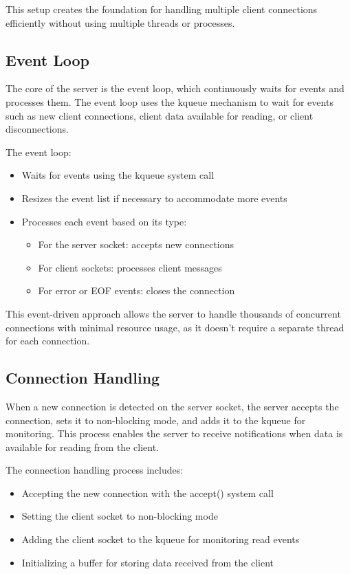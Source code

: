\documentclass{article}
\begin{document}
\noindent This setup creates the foundation for handling multiple client connections efficiently without using multiple threads or processes.

\subsection{Event Loop}

The core of the server is the event loop, which continuously waits for events and processes them. The event loop uses the kqueue mechanism to wait for events such as new client connections, client data available for reading, or client disconnections.

\noindent The event loop:
\begin{itemize}
    \item Waits for events using the kqueue system call
    \item Resizes the event list if necessary to accommodate more events
    \item Processes each event based on its type:
    \begin{itemize}
        \item For the server socket: accepts new connections
        \item For client sockets: processes client messages
        \item For error or EOF events: closes the connection
    \end{itemize}
\end{itemize}

\noindent This event-driven approach allows the server to handle thousands of concurrent connections with minimal resource usage, as it doesn't require a separate thread for each connection.

\subsection{Connection Handling}

When a new connection is detected on the server socket, the server accepts the connection, sets it to non-blocking mode, and adds it to the kqueue for monitoring. This process enables the server to receive notifications when data is available for reading from the client.

\noindent The connection handling process includes:
\begin{itemize}
    \item Accepting the new connection with the accept() system call
    \item Setting the client socket to non-blocking mode
    \item Adding the client socket to the kqueue for monitoring read events
    \item Initializing a buffer for storing data received from the client
\end{itemize}
\end{document}
